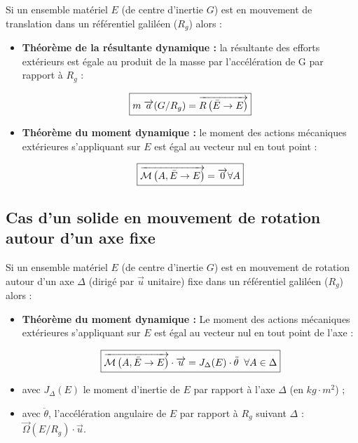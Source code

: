 \documentclass[10pt,fleqn]{article} %
\begin{document}
\begin{definition}
Si un ensemble matériel $E$ (de centre d'inertie $G$) est en mouvement de translation dans un référentiel galiléen ($R_g$) alors : 

\begin{itemize}
\item \textbf{Théorème de la résultante dynamique : } la résultante des efforts extérieurs est égale au produit de la masse par l'accélération de G par rapport à $R_g$ :

\begin{align}
\boxed{
m\;\overrightarrow{a}(G/R_g)=\vectf{\bar E}{E}%
}
\end{align}

\item \textbf{Théorème du moment dynamique : } le moment des actions mécaniques extérieures s'appliquant sur $E$ est égal au vecteur nul en tout point :

\begin{align}
\boxed{
\overrightarrow{\mathcal{M}\left( {A}, {\bar E} \rightarrow {E}\right)}=\overrightarrow{0}\forall A
}
\end{align}
\end{itemize}

\end{definition}


\subsection{Cas d'un solide en mouvement de rotation autour d'un axe fixe}


\begin{definition}
Si un ensemble matériel $E$ (de centre d'inertie $G$) est en mouvement de rotation autour d'un axe $\Delta$ (dirigé par $\overrightarrow{u}$ unitaire) fixe dans un référentiel galiléen ($R_g$) alors : 

\begin{itemize}
\item \textbf{Théorème du moment dynamique : } Le moment des actions mécaniques extérieures s'appliquant sur $E$ est égal au vecteur nul en tout point de l'axe :

\begin{align}
\boxed{
\overrightarrow{\mathcal{M}\left( {A}, {\bar E} \rightarrow {E}\right)}\cdot \overrightarrow{u}=J_{\Delta}(E)\cdot \ddot{\theta}\;\;\forall A\in \Delta
}
\end{align}
\item avec $J_{\Delta}(E)$ le moment d'inertie de $E$ par rapport à l'axe $\Delta$ (en $kg\cdot m^2$) ;
\item avec $\ddot{\theta}$, l'accélération angulaire de $E$ par rapport à $R_g$ suivant $\Delta$ : $\overrightarrow{\Omega}(E/R_g)\cdot \overrightarrow{u}$.
\end{itemize}
\end{definition}
\end{document}
